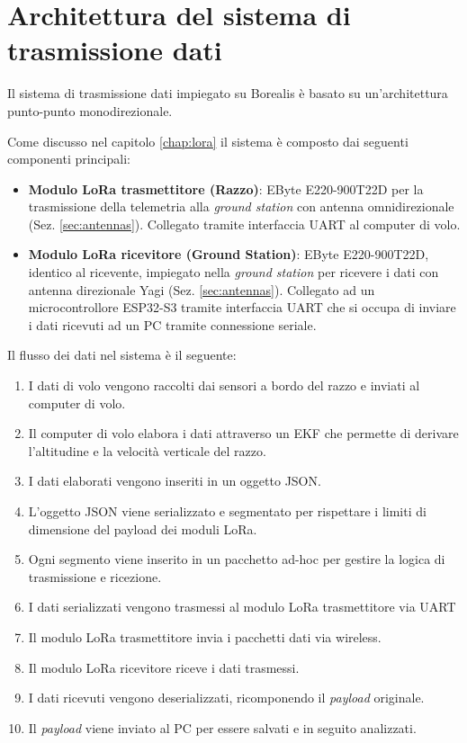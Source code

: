 \documentclass[12pt,a4paper,twoside]{book}
\begin{document}

\section{Architettura del sistema di trasmissione dati}
Il sistema di trasmissione dati impiegato su Borealis è basato su un'architettura
punto-punto monodirezionale.

Come discusso nel capitolo \ref{chap:lora} il sistema è composto dai seguenti componenti principali:
\begin{itemize}
    \item \textbf{Modulo \ac{LoRa} trasmettitore (Razzo)}: EByte E220-900T22D per
          la trasmissione della telemetria alla \emph{ground station} con antenna
          omnidirezionale (Sez. \ref{sec:antennas}).
          Collegato tramite interfaccia \ac{UART} al computer di volo.
    \item \textbf{Modulo \ac{LoRa} ricevitore (Ground Station)}: EByte E220-900T22D,
          identico al ricevente, impiegato nella \emph{ground station} per
          ricevere i dati con antenna direzionale Yagi (Sez. \ref{sec:antennas}).
          Collegato ad un microcontrollore ESP32-S3 tramite interfaccia \ac{UART}
          che si occupa di inviare i dati ricevuti ad un PC tramite connessione seriale.
\end{itemize}

Il flusso dei dati nel sistema è il seguente:
\begin{enumerate}
    \item I dati di volo vengono raccolti dai sensori a bordo del razzo e inviati al computer di volo.
    \item Il computer di volo elabora i dati attraverso un \ac{EKF} che permette di derivare l'altitudine e la velocità verticale del razzo.
    \item I dati elaborati vengono inseriti in un oggetto JSON.
    \item L'oggetto JSON viene serializzato e segmentato per rispettare i limiti di dimensione del payload dei moduli \ac{LoRa}.
    \item Ogni segmento viene inserito in un pacchetto ad-hoc per gestire la logica di trasmissione e ricezione.
    \item I dati serializzati vengono trasmessi al modulo \ac{LoRa} trasmettitore via \ac{UART}
    \item Il modulo \ac{LoRa} trasmettitore invia i pacchetti dati via wireless.
    \item Il modulo \ac{LoRa} ricevitore riceve i dati trasmessi.
    \item I dati ricevuti vengono deserializzati, ricomponendo il \emph{payload} originale.
    \item Il \emph{payload} viene inviato al PC per essere salvati e in seguito analizzati.
\end{enumerate} 
\end{document}
